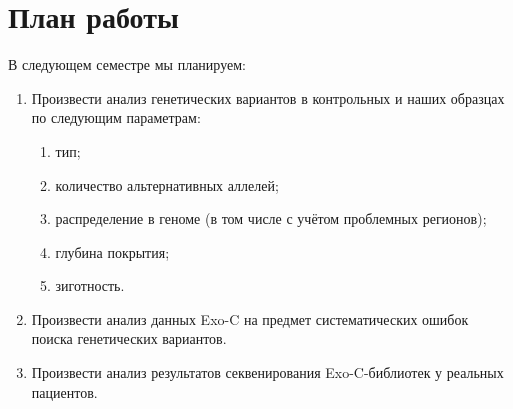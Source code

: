 \documentclass[a4paper,14pt]{extarticle}
\begin{document}
\section{План работы}

В следующем семестре мы планируем:

\begin{enumerate}
\item Произвести анализ генетических вариантов в контрольных и наших образцах по следующим параметрам:
\begin{enumerate}
\item тип;
\item количество альтернативных аллелей;
 \item распределение в геноме (в том числе с учётом проблемных регионов);
 \item глубина покрытия;
 \item зиготность.
\end{enumerate}

\item Произвести анализ данных Exo-C на предмет систематических ошибок поиска генетических вариантов.

\item Произвести анализ результатов секвенирования Exo-C\hyp{}библиотек у реальных пациентов.

\end{enumerate}

\newpage
% 



\newpage

\appendix
\end{document}
